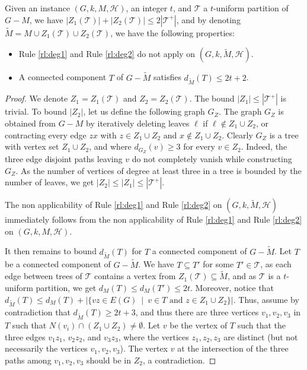 \documentclass{amsart}
\newcommand{\mT}{\mathcal{T}}
\newcommand{\mH}{\mathcal{H}}
\newcommand{\ruleref}[1]{\hyperref[#1]{\ref*{#1}}}
\begin{document}
\begin{lemma}\label{lm:special}
    Given an instance $(G, k, M, \mH)$, an integer $t$, and $\mT$ a $t$-uniform partition of $G-M$, we have $|Z_1(\mT)|+|Z_2(\mT)|\leq 2|\mT^+|$, and by denoting $\tilde{M}=M\cup Z_1(\mT)\cup Z_2(\mT)$, we have the following properties:
    \begin{itemize}
        \item Rule \ruleref{rl:deg1} and Rule \ruleref{rl:deg2} do not apply on $(G,k,\tilde{M},\mH)$.
        \item A connected component $T$ of $G-\tilde{M}$ satisfies $d_{\tilde{M}}(T)\leq 2t+2$.
    \end{itemize}
\end{lemma}
\begin{proof}
    We denote $Z_1=Z_1(\mT)$ and $Z_2=Z_2(\mT)$. The bound $|Z_1|\leq |\mT^+|$ is trivial.
    To bound $|Z_2|$, let us define the following
    graph $G_Z$. The graph $G_Z$ is obtained from $G - M$ by iteratively deleting leaves $\ell$ if $\ell\notin Z_1\cup Z_2$, or contracting every edge $zx$ with $z\in Z_1\cup Z_2$ and $x\notin Z_1\cup Z_2$. Clearly $G_Z$ is a tree with vertex set $Z_1\cup Z_2$, and where $d_{G_Z}(v)\ge 3$ for every $v\in Z_2$. Indeed, the three edge disjoint paths leaving $v$ do not completely vanish while constructing $G_Z$.  
    As the number of vertices of degree at least three in a tree is bounded by the number of leaves, we get $|Z_2|\leq |Z_1| \le |\mT^+|$.
    
    The non applicability of Rule \ruleref{rl:deg1} and Rule \ruleref{rl:deg2} on $(G,k,\tilde{M},\mH)$ immediately follows from the non applicability of Rule \ruleref{rl:deg1} and Rule \ruleref{rl:deg2} on $(G,k,M,\mH)$.
    
    It then remains to bound $d_{\tilde{M}}(T)$ for $T$ a connected component of $G-\tilde{M}$.  
    Let $T$ be a connected component of $G-\tilde{M}$. We have $T \subseteq T'$ for some $T' \in \mT$, as each edge between trees of $\mT$ contains a vertex from $Z_1(\mT)\subseteq \tilde{M}$, and as $\mT$ is a $t$-uniform partition, we get $d_M(T) \le d_M(T') \le 2t$. Moreover, notice that $d_{\tilde{M}}(T) \le d_M(T)+|\{vz \in E(G)\ \mid\ v \in T \text{ and } z\in Z_1\cup Z_2\}|$.
    Thus, assume by contradiction that $d_{\tilde{M}}(T) \ge 2t+3$, and thus there are three vertices $v_1,v_2,v_3$ in $T$ such that $N(v_i) \cap (Z_1 \cup Z_2) \neq \emptyset$.
    Let $v$ be the vertex of $T$ such that the three edges $v_1z_1$, $v_2z_2$, and $v_3z_3$, where the vertices $z_1,z_2,z_3$ are distinct (but not necessarily the vertices $v_1,v_2,v_3$). The vertex $v$ at the intersection of the three paths among $v_1,v_2,v_3$ should be in $Z_2$, a contradiction.
\end{proof}
\end{document}
